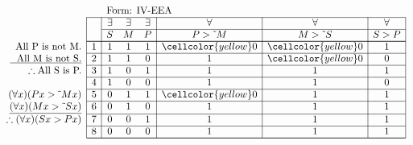 \documentclass[10pt,legalpaper,landscape,cmtt]{article}
\begin{document}
{\begin{minipage}[t]{3.25in}
	\(
	\begin{array}{r|c|ccc|c|c|c|}
		\multicolumn{2}{c}{}&\multicolumn{6}{l}{\mbox{Form: IV-EEA}} \\ \cline{2-8}
		\hspace{1in}	&	& \exists & \exists & \exists & \forall & \forall & \forall\\ \cline{3-8}
		&	& S & M & P &  P > \tilde~M  &  M > \tilde~S  &  S > P \\ \cline{2-8} \cline{2-8}
		\phantom{\therefore}\mbox{All P is not M.}   & 1 & 1 & 1 & 1 &   \cellcolor{yellow} 0   &   \cellcolor{yellow} 0   &   1  \\ \cline{2-8}
		\underline{\phantom{\therefore}\mbox{All M is not S.}}   & 2 & 1 & 1 & 0 &   1   &   \cellcolor{yellow} 0   &   0  \\ \cline{2-8}
		\therefore \mbox{All S is P.}   & 3 & 1 & 0 & 1 &   1   &   1   &   1  \\ \cline{2-8}
		& 4 & 1 & 0 & 0 &   1   &   1   &   0  \\ \cline{2-8}
		(\forall x)(Px > \tilde~Mx)   & 5 & 0 & 1 & 1 &   \cellcolor{yellow} 0   &   1   &   1  \\ \cline{2-8}
		\underline{(\forall x)(Mx > \tilde~Sx)}   & 6 & 0 & 1 & 0 &   1   &   1   &   1  \\ \cline{2-8}
		\therefore(\forall x)(Sx > Px)   & 7 & 0 & 0 & 1 &   1   &   1   &   1  \\ \cline{2-8}
		& 8 & 0 & 0 & 0 &   1   &   1   &   1   \\ \cline{2-8}\cline{2-8} 
	\end{array}
	\)
\end{minipage}

}
\end{document}
